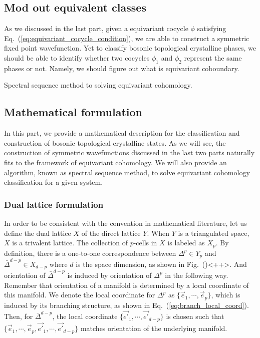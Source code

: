 \documentclass[reprint,amsmath,amssymb,aps,pra,]{revtex4-1}
\begin{document}
\subsection{Mod out equivalent classes}
As we discussed in the last part, given a equivariant cocycle $\phi$ satisfying Eq.~(\ref{eq:equivariant_cocycle_condition}), we are able to construct a symmetric fixed point wavefunction.
Yet to classify bosonic topological crystalline phases, we should be able to identify whether two cocycles $\phi_1$ and $\phi_2$ represent the same phases or not.
Namely, we should figure out what is equivariant coboundary.

{\color{red} Spectral sequence method to solving equivariant cohomology.}

\subsection{Mathematical formulation}\label{subapp:equivariant_cohomology_math_formulation}
In this part, we provide a mathematical description for the classification and construction of bosonic topological crystalline states.
As we will see, the construction of symmetric wavefunctions discussed in the last two parts naturally fits to the framework of equivariant cohomology\cite{Brown2012cohomology,ThorngrenElse2018gauging}. 
We will also provide an algorithm, known as spectral sequence method, to solve equivariant cohomology classification for a given system.

\subsubsection{Dual lattice formulation}
In order to be consistent with the convention in mathematical literature, let us define the dual lattice $X$ of the direct lattice $Y$.
When $Y$ is a triangulated space, $X$ is a trivalent lattice.
The collection of $p$-cells in $X$ is labeled as $X_p$.
By definition, there is a one-to-one correspondence between ${\Delta^p}\in Y_p$ and $\bar{\Delta}^{d-p}\in X_{d-p}$ where $d$ is the space dimension, as shown in Fig.~()<++>.
And orientation of $\bar{\Delta}^{d-p}$ is induced by orientation of $\Delta^p$ in the following way.
Remember that orientation of a manifold is determined by a local coordinate of this manifold.
We denote the local coordinate for $\Delta^p$ as $\{\vec{e}_1,\cdots,\vec{e}_p\}$, which is induced by its branching structure, as shown in Eq.~(\ref{eq:branch_local_coord}).
Then, for $\bar{\Delta}^{d-p}$, the local coordinate $\{\vec{e'}_1,\cdots,\vec{e'}_{d-p}\}$ is chosen such that $\{\vec{e}_1,\cdots,\vec{e}_p,\vec{e'}_1,\cdots,\vec{e'}_{d-p}\}$ matches orientation of the underlying manifold.
\end{document}
